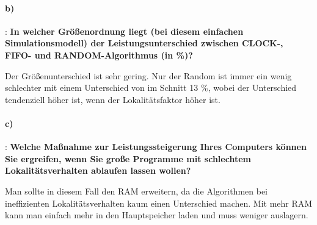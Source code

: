 \documentclass[]{scrartcl}
\begin{document}
\paragraph{b)}:
\textbf{In welcher Gr\"o\ss{}enordnung liegt (bei diesem einfachen Simulationsmodell) der Leistungsunterschied zwischen CLOCK-, FIFO- und RANDOM-Algorithmus (in \%)?}

\vspace{1em}
Der Gr\"o\ss{}enunterschied ist sehr gering. Nur der Random ist immer ein wenig schlechter mit einem Unterschied von im Schnitt 13 \%, wobei der Unterschied tendenziell h\"oher ist, wenn der Lokalit\"atsfaktor h\"oher ist.

\paragraph{c)}:
\textbf{Welche Ma\ss{}nahme zur Leistungssteigerung Ihres Computers k\"onnen Sie ergreifen, wenn Sie gro\ss{}e Programme mit schlechtem Lokalit\"atsverhalten ablaufen lassen wollen?}

\vspace{1em}
Man sollte in diesem Fall den RAM erweitern, da die Algorithmen bei ineffizienten Lokalit\"atsverhalten kaum einen Unterschied machen. Mit mehr RAM kann man einfach mehr in den Hauptspeicher laden und muss weniger auslagern.
\end{document}
